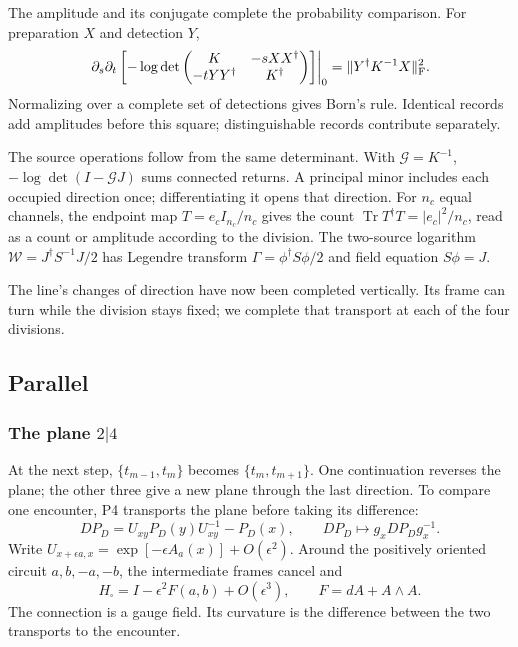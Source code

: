 \documentclass[aps,prx,reprint,longbibliography]{revtex4-2}
\providecommand{\Tr}{\operatorname{Tr}}
\begin{document}
The amplitude and its conjugate complete the probability comparison. For preparation $X$ and detection $Y$,
\begin{equation}
 \left.\partial_s\partial_t\left[-\log\det
 \begin{pmatrix}K&-sXX^\dagger\\-tYY^\dagger&K^\dagger\end{pmatrix}\right]\right|_0
 =\|Y^\dagger K^{-1}X\|_{\rm F}^2.
 \label{eq:born}
\end{equation}
Normalizing over a complete set of detections gives Born's rule. Identical records add amplitudes before this square; distinguishable records contribute separately.

The source operations follow from the same determinant. With $\mathcal G=K^{-1}$, $-\log\det(I-\mathcal GJ)$ sums connected returns. A principal minor includes each occupied direction once; differentiating it opens that direction. For $n_c$ equal channels, the endpoint map $T=e_cI_{n_c}/n_c$ gives the count $\Tr T^\dagger T=|e_c|^2/n_c$, read as a count or amplitude according to the division. The two-source logarithm $\mathcal W=J^\dagger S^{-1}J/2$ has Legendre transform $\Gamma=\phi^\dagger S\phi/2$ and field equation $S\phi=J$.

The line's changes of direction have now been completed vertically. Its frame can turn while the division stays fixed; we complete that transport at each of the four divisions.

\subsection{Parallel}
\label{sec:parallel}
\setcounter{subsubsection}{4}

\subsubsection{The plane \texorpdfstring{$2|4$}{2|4}}
\label{sec:plane}

At the next step, $\{t_{m-1},t_m\}$ becomes $\{t_m,t_{m+1}\}$. One continuation reverses the plane; the other three give a new plane through the last direction. To compare one encounter, P4 transports the plane before taking its difference:
\begin{equation}
 DP_D=U_{xy}P_D(y)U_{xy}^{-1}-P_D(x),\qquad
 DP_D\mapsto g_xDP_Dg_x^{-1}.
 \label{eq:covariant}
\end{equation}
Write $U_{x+\epsilon a,x}=\exp[-\epsilon A_a(x)]+O(\epsilon^2)$. Around the positively oriented circuit $a,b,-a,-b$, the intermediate frames cancel and
\begin{equation}
 H_\square=I-\epsilon^2F(a,b)+O(\epsilon^3),\qquad
 F=dA+A\wedge A.
 \label{eq:curvature}
\end{equation}
The connection is a gauge field. Its curvature is the difference between the two transports to the encounter.
\end{document}
